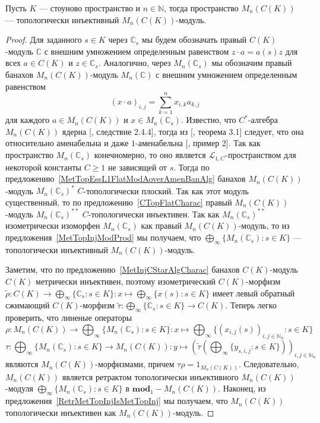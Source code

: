 \begin{proposition}\label{CKMatrixModTopInj} Пусть $K$ --- стоуново пространство
и $n\in\mathbb{N}$, тогда пространство $M_n(C(K))$ --- топологически инъективный
$M_n(C(K))$-модуль.
\end{proposition}
\begin{proof} Для заданного $s\in K$ через $\mathbb{C}_s$ мы будем обозначать
правый $C(K)$-модуль $\mathbb{C}$ с внешним умножением определенным равенством
$z\cdot a=a(s)z$ для всех $a\in C(K)$ и $z\in\mathbb{C}_s$. Аналогично, через
$M_n(\mathbb{C}_s)$ мы обозначим правый банахов $M_n(C(K))$-модуль
$M_n(\mathbb{C})$ с внешним умножением определенным равенством
$$
{(x\cdot a)}_{i,j}=\sum_{k=1}^n x_{i,k}a_{k,j}
$$
для каждого $a\in M_n(C(K))$ и $x\in M_n(\mathbb{C}_s)$. Известно, что
$C^*$-алгебра $M_n(C(K))$ ядерна [\cite{BroOzaCStarAlgFinDimApprox}, следствие
2.4.4], тогда из [\cite{HaaNucCStarAlgAmen}, теорема 3.1] следует, что она
относительно аменабельна и даже $1$-аменабельна [\cite{RundeAmenConstFour},
пример 2]. Так как пространство $M_n(\mathbb{C}_s)$ конечномерно, то оно
является $\mathscr{L}_{1,C}$-пространством для некоторой константы $C\geq 1$ не
зависящей от $s$. Тогда по предложению~\ref{MetTopEssL1FlatModAoverAmenBanAlg}
банахов $M_n(C(K))$-модуль ${M_n(\mathbb{C}_s)}^*$ $C$-топологически плоский. Так
как этот модуль существенный, то по предложению~\ref{CTopFlatCharac} правый
$M_n(C(K))$-модуль ${M_n(\mathbb{C}_s)}^{**}$ $C$-топологически инъективен. Так
как ${M_n(\mathbb{C}_s)}^{**}$ изометрически изоморфен $M_n(\mathbb{C}_s)$ как
правый $M_n(C(K))$-модуль, то из предложения~\ref{MetTopInjModProd} мы получаем,
что $\bigoplus_\infty \{M_n(\mathbb{C}_s):s\in K \}$ --- топологически
инъективный $M_n(C(K))$-модуль.

Заметим, что по предложению~\ref{MetInjCStarAlgCharac} банахов $C(K)$-модуль
$C(K)$ метрически инъективен, поэтому изометрический $C(K)$-морфизм
$\widetilde{\rho}:C(K)\to\bigoplus_\infty \{ \mathbb{C}_s:s\in K \}
:x\mapsto \bigoplus_\infty \{x(s):s\in K \}$ 
имеет левый обратный сжимающий $C(K)$-морфизм
$\widetilde{\tau}:\bigoplus_\infty \{ \mathbb{C}_s:s\in K \} \to C(K)$. Теперь
легко проверить, что линеные операторы
$$
\rho:M_n(C(K))\to\bigoplus\nolimits_\infty \{M_n(\mathbb{C}_s):s\in K \}
:x\mapsto \bigoplus\nolimits_\infty \{
    {(x_{i,j}(s))}_{i,j\in\mathbb{N}_n}:s\in K 
 \}
$$
$$
\tau:\bigoplus\nolimits_\infty \{M_n(\mathbb{C}_s):s\in K \}\to M_n(C(K))
:y\mapsto {\left(
    \widetilde{\tau}\left(\bigoplus\nolimits_\infty \{y_{s,i,j}:s\in K \}\right)
    \right)}_{i,j\in\mathbb{N}_n}
$$
являются $M_n(C(K))$-морфизмами, причем $\tau \rho=1_{M_n(C(K))}$.
Следовательно, $M_n(C(K))$ является ретрактом топологически инъективного
$M_n(C(K))$-модуля $\bigoplus_\infty \{M_n(\mathbb{C}_s):s\in K \}$ в
$\mathbf{mod}_1-M_n(C(K))$. Наконец, из
предложения~\ref{RetrMetTopInjIsMetTopInj} мы получаем, что $M_n(C(K))$
топологически инъективен как $M_n(C(K))$-модуль.
\end{proof}

